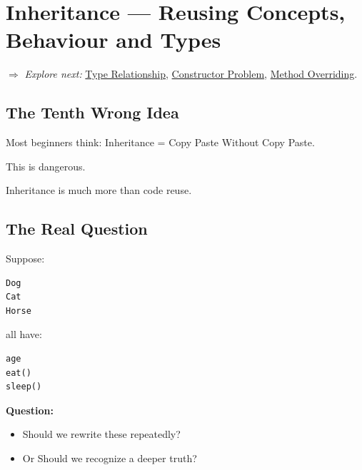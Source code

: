 \documentclass[11pt,a4paper]{book}
\begin{document}
\chapter{Inheritance --- Reusing Concepts, Behaviour and Types}\label{chap:inheritance}

\smallskip
\noindent
\textcolor{RosettaRoyalPurple}{$\Rightarrow$}
\emph{Explore next: }
\hyperref[sec:inheritance_type_relationship]{Type Relationship},
\hyperref[sec:inheritance_constructor_problem]{Constructor Problem},
\hyperref[sec:method_overriding]{Method Overriding}.


\section{The Tenth Wrong Idea}\label{sec:inheritance_wrong_idea}

\begin{trap}

Most beginners think:
\newline
\textcolor{RosettaRoyalPurple}{Inheritance} = Copy Paste Without Copy Paste.

This is dangerous.

Inheritance is much more than code reuse.

\end{trap}


\section{The Real Question}

Suppose:

\begin{verbatim}
Dog
Cat
Horse
\end{verbatim}

all have:

\begin{verbatim}
age
eat()
sleep()
\end{verbatim}


\textbf{\textbf{Question:}}
\begin{itemize}
\item Should we rewrite these repeatedly?

\item Or Should we recognize a deeper truth?
\end{itemize}
\end{document}
